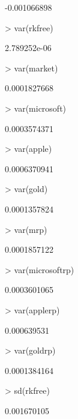 \documentclass[12pt, a14paper, lithuanian]{article}
\begin{document}
\begin{Schunk}
\begin{Soutput}
[1] -0.001066898
\end{Soutput}
\begin{Sinput}
> var(rkfree)
\end{Sinput}
\begin{Soutput}
[1] 2.789252e-06
\end{Soutput}
\begin{Sinput}
> var(market)
\end{Sinput}
\begin{Soutput}
[1] 0.0001827668
\end{Soutput}
\begin{Sinput}
> var(microsoft)
\end{Sinput}
\begin{Soutput}
[1] 0.0003574371
\end{Soutput}
\begin{Sinput}
> var(apple)
\end{Sinput}
\begin{Soutput}
[1] 0.0006370941
\end{Soutput}
\begin{Sinput}
> var(gold)
\end{Sinput}
\begin{Soutput}
[1] 0.0001357824
\end{Soutput}
\begin{Sinput}
> var(mrp)
\end{Sinput}
\begin{Soutput}
[1] 0.0001857122
\end{Soutput}
\begin{Sinput}
> var(microsoftrp)
\end{Sinput}
\begin{Soutput}
[1] 0.0003601065
\end{Soutput}
\begin{Sinput}
> var(applerp)
\end{Sinput}
\begin{Soutput}
[1] 0.000639531
\end{Soutput}
\begin{Sinput}
> var(goldrp)
\end{Sinput}
\begin{Soutput}
[1] 0.0001384164
\end{Soutput}
\begin{Sinput}
> sd(rkfree)
\end{Sinput}
\begin{Soutput}
[1] 0.001670105
\end{Soutput}
\begin{Sinput}

\end{Sinput}
\end{Schunk}
\end{document}
